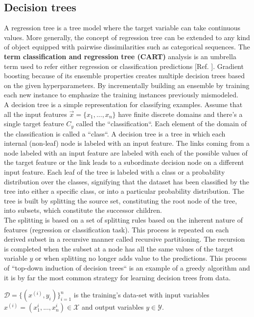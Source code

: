 \documentclass[12pt, a4paper]{article}
\begin{document}
\subsection{Decision trees}
A regression tree is a tree model where the target variable can take continuous values. More generally, the concept of regression tree can be extended to any kind of object equipped with pairwise dissimilarities such as categorical sequences. The \textbf{term classification and regression tree (CART)} analysis is an umbrella term used to refer either regression or classification predictions [Ref. \cite{Dan2009}]. Gradient boosting because of its ensemble properties creates multiple decision trees based on the given hyperparameters. By incrementally building an ensemble by training each new instance to emphasize the training instances previously mismodeled.  \\
A decision tree is a simple representation for classifying examples. Assume that all the input features $\vec{x} = \{x_1,...,x_n\}$ have finite discrete domains and there's a single target feature $C_y$ called the ``classification``. 
Each element of the domain of the classification is called a ``class``. A decision tree is a tree in which each internal (non-leaf) node is labeled with an input feature. The links coming from a node labeled with an input feature are labeled with each of the possible values of the target feature or the link leads to a subordinate decision node on a different input feature. Each leaf of the tree is labeled with a class or a probability distribution over the classes, signifying that the dataset has been classified by the tree into either a specific class, or into a particular probability distribution. 
The tree is built by splitting the source set, constituting the root node of the tree, into subsets, which constitute the successor children.\\
The splitting is based on a set of splitting rules based on the inherent nature of features (regression or classification task). This process is repeated on each derived subset in a recursive manner called recursive partitioning. The recursion is completed when the subset at a node has all the same values of the target variable $y$ or when splitting no longer adds value to the predictions. This process of ``top-down induction of decision trees`` is an example of a greedy algorithm and it is by far the most common strategy for learning decision trees from data.
\begin{center}
$\mathcal{D} = \{(x^{(i)},y_i)\}_{i=1}^n$ is the training's data-set with input variables $x^{(i)} = (x_1^{i} ,...,x_n^{i}) \in \mathcal{X}$ and output variables $y \in \mathcal{Y}$.
\end{center}
\end{document}
